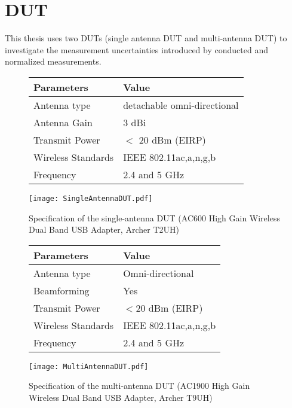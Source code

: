 \section{\ac{DUT}}
This thesis uses two \acsp{DUT} (single antenna \acs{DUT} and multi-antenna \acs{DUT}) to investigate the measurement uncertainties introduced by conducted and normalized measurements. 

\begin{figure}[h]
    \begin{minipage}[c]{.7\textwidth}%
        \begin {tabular} {|l|l|} 
\toprule
Parameters & Value \\ 
\midrule 
Antenna type & detachable omni-directional \\
Antenna Gain & 3 dBi \\
Transmit Power & $<$ 20 dBm (\acs{EIRP})\\ 
Wireless Standards & \acs{IEEE} 802.11ac,a,n,g,b \\
Frequency & 2.4 and 5 GHz \\
\bottomrule
\end {tabular}    \end{minipage}
    \hfill
    \begin{minipage}[c]{.2\textwidth}
        \texttt{[image: SingleAntennaDUT.pdf]}
    \end{minipage}
    \caption{Specification of the single-antenna \acs{DUT} (AC600 High Gain Wireless Dual Band USB Adapter, Archer T2UH)}
\label{fig:singleAntennaDUT}
\end{figure}     

\begin{figure}[h]
    \begin{minipage}[c]{.7\textwidth}%
        \begin {tabular} {|l|l|} 
\toprule
Parameters & Value \\ 
\midrule 
Antenna type & Omni-directional \\
Beamforming & Yes \\
Transmit Power &  $<$20 dBm (\acs{EIRP})\\ 
Wireless Standards & \acs{IEEE} 802.11ac,a,n,g,b \\
Frequency & 2.4 and 5 GHz \\
\bottomrule
\end {tabular}    \end{minipage}
    \hfill
    \begin{minipage}[c]{.2\textwidth}
        \texttt{[image: MultiAntennaDUT.pdf]}
    \end{minipage}
    \caption{Specification of the multi-antenna \acs{DUT} (AC1900 High Gain Wireless Dual Band USB Adapter, Archer T9UH)}
\label{fig:multiAntennaDUT}
\end{figure}     
